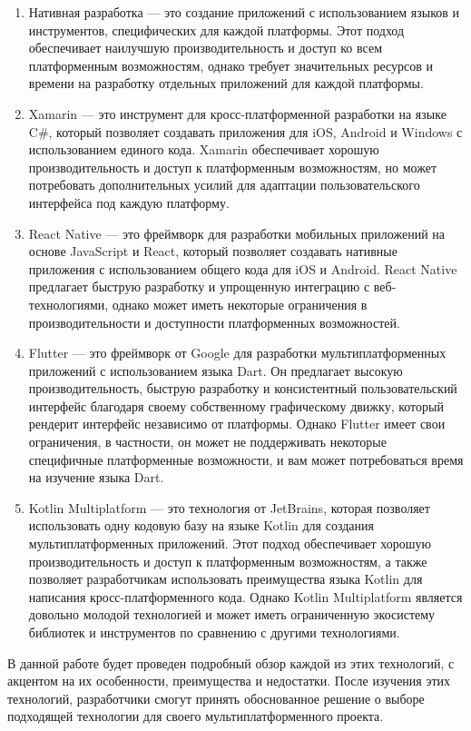 \documentclass[14pt, russian]{scrartcl}
\begin{document}
\begin{enumerate}    
    \item Нативная разработка --- это создание приложений с использованием языков и инструментов, специфических для каждой платформы. Этот подход обеспечивает наилучшую производительность и доступ ко всем платформенным возможностям, однако требует значительных ресурсов и времени на разработку отдельных приложений для каждой платформы.
    \item Xamarin --- это инструмент для кросс-платформенной разработки на языке C\#, который позволяет создавать приложения для iOS, Android и Windows с использованием единого кода. Xamarin обеспечивает хорошую производительность и доступ к платформенным возможностям, но может потребовать дополнительных усилий для адаптации пользовательского интерфейса под каждую платформу.
    \item React Native --- это фреймворк для разработки мобильных приложений на основе JavaScript и React, который позволяет создавать нативные приложения с использованием общего кода для iOS и Android. React Native предлагает быструю разработку и упрощенную интеграцию с веб-технологиями, однако может иметь некоторые ограничения в производительности и доступности платформенных возможностей.
    \item Flutter --- это фреймворк от Google для разработки мультиплатформенных приложений с использованием языка Dart. Он предлагает высокую производительность, быструю разработку и консистентный пользовательский интерфейс благодаря своему собственному графическому движку, который рендерит интерфейс независимо от платформы. Однако Flutter имеет свои ограничения, в частности, он может не поддерживать некоторые специфичные платформенные возможности, и вам может потребоваться время на изучение языка Dart.
    \item Kotlin Multiplatform --- это технология от JetBrains, которая позволяет использовать одну кодовую базу на языке Kotlin для создания мультиплатформенных приложений. Этот подход обеспечивает хорошую производительность и доступ к платформенным возможностям, а также позволяет разработчикам использовать преимущества языка Kotlin для написания кросс-платформенного кода. Однако Kotlin Multiplatform является довольно молодой технологией и может иметь ограниченную экосистему библиотек и инструментов по сравнению с другими технологиями.
\end{enumerate}

В данной работе будет проведен подробный обзор каждой из этих технологий, с акцентом на их особенности, преимущества и недостатки. После изучения этих технологий, разработчики смогут принять обоснованное решение о выборе подходящей технологии для своего мультиплатформенного проекта.
\end{document}
